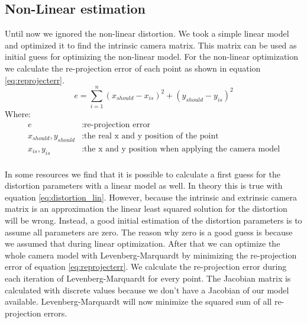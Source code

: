 \documentclass[11pt,a4paper,titlepage,oneside]{report}
\begin{document}
\subsection{Non-Linear estimation}\label{sec:nonlinear_est}
Until now we ignored the non-linear distortion. We took a simple linear model and optimized it to find the intrinsic camera matrix. This matrix can be used as initial guess for optimizing the non-linear model. For the non-linear optimization we calculate the re-projection error of each point as shown in equation \ref{eq:reprojecterr}. 
\begin{equation}\label{eq:reprojecterr}
	e=\sum\limits_{i=1}^n(x_{should}-x_{is})^2 +(y_{should}-y_{is})^2
\end{equation}
Where:
\begin{align*}
	e												&: \text{re-projection error}\\
	x_{should},y_{should}		&: \text{the real x and y position of the point}\\
	x_{is},y_{is}						&: \text{the x and y position when applying the camera model}\\
\end{align*}

In some resources we find that it is possible to calculate a first guess for the distortion parameters with a linear model as well. In theory this is true with equation \ref{eq:distortion_lin}.  However, because the intrinsic and extrinsic camera matrix is an approximation the linear least squared solution for the distortion will be wrong. Instead, a good initial estimation of the distortion parameters is to assume all parameters are zero. The reason why zero is a good guess is because we assumed that during linear optimization. After that we can optimize the whole camera model with Levenberg-Marquardt by minimizing the re-projection error of equation \ref{eq:reprojecterr}. We calculate the re-projection error during each iteration of Levenberg-Marquardt for every point. The Jacobian matrix is calculated with discrete values because we don't have a Jacobian of our model available. Levenberg-Marquardt will now minimize the squared sum of all re-projection errors.
\end{document}

